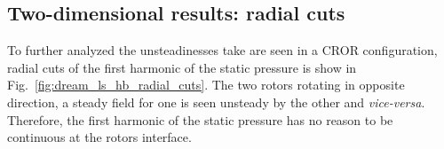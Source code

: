 \subsection{Two-dimensional results: radial cuts}
\label{sub:dream_ls_hb_radial_cuts}

To further analyzed the unsteadinesses take are seen
in a CROR configuration, radial cuts of the first harmonic
of the static pressure is show in 
Fig.~\ref{fig:dream_ls_hb_radial_cuts}.
The two rotors rotating in opposite direction, a steady
field for one is seen unsteady by the other and \emph{vice-versa}.
Therefore, the first harmonic of the static pressure has no
reason to be continuous at the rotors interface.

